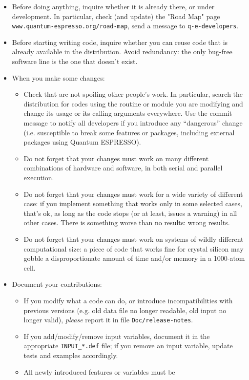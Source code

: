 \documentclass[12pt,a4paper]{article}
\def\qe{{\sc Quantum ESPRESSO}}
\begin{document}
\begin{itemize}
\item Before doing anything, inquire whether it is already there,
or under development. In particular, check (and update) the "Road Map"
page \texttt{www.quantum-espresso.org/road-map}, send a message to
\texttt{q-e-developers}.
\item Before starting writing code, inquire whether you can reuse
code that is already available in the distribution. Avoid redundancy: 
the only bug-free software line is the one that doesn't exist.
\item When you make some changes:
\begin{itemize}
\item Check that are not spoiling other people's work. In particular, 
search the distribution for codes using the routine or module you are 
modifying and change its usage or its calling arguments everywhere.
Use the commit message to notify all developers if you introduce any 
``dangerous'' change (i.e. susceptible to break some features or 
packages, including external packages using \qe).
\item Do not forget that your changes must work on many different 
combinations of hardware and software, in both serial and parallel execution.
\item Do not forget that your changes must work for a wide variety of
different case: if you implement something that works only in some 
selected cases, that's ok, as long as the code stops (or at least,
issues a warning) in all other cases. There is something worse than
no results: wrong results.
\item Do not forget that your changes must work on systems of wildly
different computational size: a piece of code that works fine for
crystal silicon may gobble a disproportionate amount of time and/or
memory in a 1000-atom cell.
\end{itemize}
\item Document your contributions:
\begin{itemize}
\item If you modify what a code can do, or introduce
incompatibilities with previous versions (e.g. old data file 
no longer readable, old input no longer valid), {\em please}
report it in file \texttt{Doc/release-notes}.
\item If you add/modify/remove input variables, document
it in the appropriate
\texttt{INPUT\_*.def} file; if
you remove an input variable, update tests and examples
accordingly.
\item All newly introduced features or variables must be 

\end{itemize}
\end{itemize}
\end{document}
